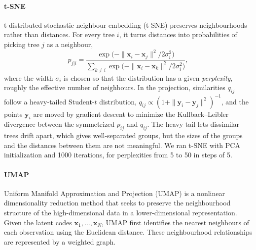 \paragraph{t-SNE}                        %
t-distributed stochastic neighbour embedding (t-SNE) \cite{vandermaaten2008tsne} preserves
neighbourhoods rather than distances. For every tree $i$, it turns distances into probabilities
of picking tree $j$ as a neighbour,
\begin{equation}
  p_{j|i} = \frac{\exp\!\big(-\|\mathbf{x}_i - \mathbf{x}_j\|^2 / 2\sigma_i^2\big)}
                 {\sum_{k \neq i} \exp\!\big(-\|\mathbf{x}_i - \mathbf{x}_k\|^2 / 2\sigma_i^2\big)} ,
  \label{eq:tsne_p}                      %
\end{equation}
where the width $\sigma_i$ is chosen so that the distribution has a given \emph{perplexity},
roughly the effective number of neighbours. In the projection, similarities $q_{ij}$ follow a
heavy-tailed Student-$t$ distribution, $q_{ij} \propto (1 + \|\mathbf{y}_i - \mathbf{y}_j\|^2)^{-1}$,
and the points $\mathbf{y}_i$ are moved by gradient descent to minimize the Kullback--Leibler
divergence between the symmetrized $p_{ij}$ and $q_{ij}$. The heavy tail lets dissimilar trees
drift apart, which gives well-separated groups, but the sizes of the groups and the distances
between them are not meaningful. We ran t-SNE with PCA initialization and 1000 iterations, for
perplexities from 5 to 50 in steps of 5.

\paragraph{UMAP}
Uniform Manifold Approximation and Projection (UMAP) \cite{mcinnes2018umap} is a nonlinear
dimensionality reduction method that seeks to preserve the neighbourhood structure of the
high-dimensional data in a lower-dimensional representation. Given the latent codes
$\mathbf{x}_1,\ldots,\mathbf{x}_N$, UMAP first identifies the nearest neighbours of each
observation using the Euclidean distance. These neighbourhood relationships are represented by
a weighted graph.

